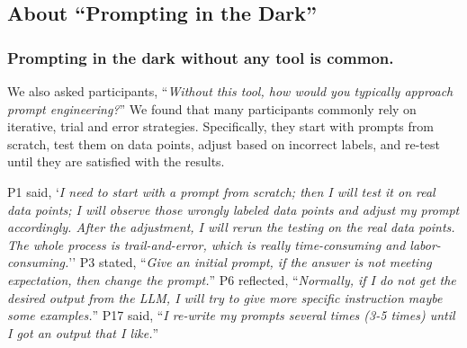\subsection{About ``Prompting in the Dark''}

\subsubsection{Prompting in the dark without any tool is common.}
We also asked participants, ``\textit{Without this tool, how would you typically approach prompt engineering?}''
We found that many participants commonly rely on iterative, trial and error strategies. Specifically, they start with prompts from scratch, test them on data points, adjust based on incorrect labels, and re-test until they are satisfied with the results.

P1 said, `\textit{I need to start with a prompt from scratch; then I will test it on real data points; I will observe those wrongly labeled data points and adjust my prompt accordingly. After the adjustment, I will rerun the testing on the real data points. The whole process is trail-and-error, which is really time-consuming and labor-consuming.}''
P3 stated, ``\textit{Give an initial prompt, if the answer is not meeting expectation, then change the prompt.}''
P6 reflected, ``\textit{Normally, if I do not get the desired output from the LLM, I will try to give more  specific instruction maybe some examples.}''
P17 said, ``\textit{I re-write my prompts several times (3-5 times) until I got an output that I like.}''

